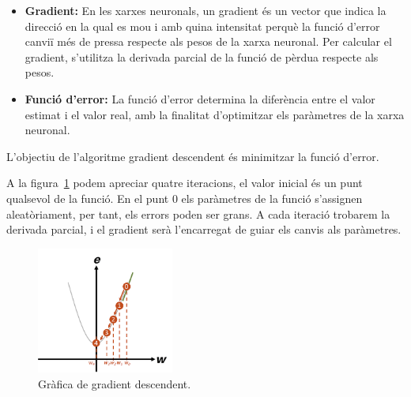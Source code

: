     \begin{itemize}

     \item \textbf{Gradient: } En les xarxes neuronals, un gradient és un vector que indica la direcció en la qual es mou i amb quina intensitat perquè la funció d'error canviï més de pressa respecte als pesos de la xarxa neuronal. Per calcular el gradient, s'utilitza la derivada parcial de la funció de pèrdua respecte als pesos.

     \item \textbf{Funció d'error: } La funció d'error determina la diferència entre el valor estimat i el valor real, amb la finalitat d'optimitzar els paràmetres de la xarxa neuronal.

    \end{itemize}

%

         L'objectiu de l'algoritme gradient descendent és minimitzar la funció d'error.





          A la figura~\ref{GraficaDescendet} podem apreciar quatre iteracions, el valor inicial és un punt qualsevol de la funció. En el punt 0 els paràmetres de la funció s'assignen aleatòriament, per tant, els errors poden ser grans. A cada iteració trobarem la derivada parcial, i el gradient serà l'encarregat de guiar els canvis als paràmetres.

        \begin{figure}[H]
         \centering
         \includegraphics[width=0.4\textwidth]{./figures/gradient_descendent.png}
        \caption{Gràfica de gradient descendent.~\cite{Img_gradient}}
        \label{GraficaDescendet}
         \end{figure}


